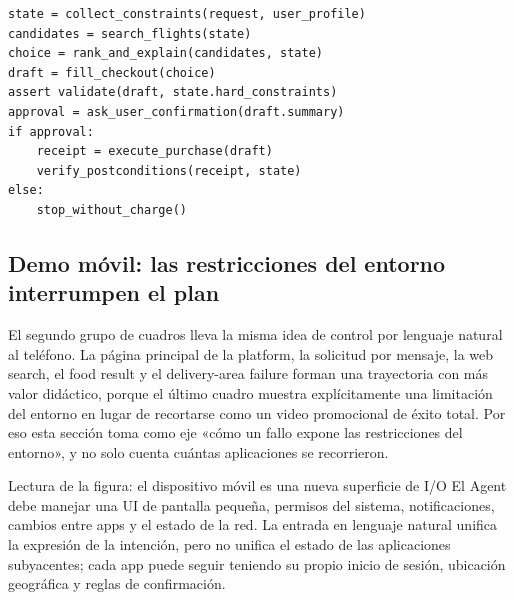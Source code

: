
\begin{lstlisting}[caption={Máquina de estados de compra de boletos con puerta de confirmación}]
state = collect_constraints(request, user_profile)
candidates = search_flights(state)
choice = rank_and_explain(candidates, state)
draft = fill_checkout(choice)
assert validate(draft, state.hard_constraints)
approval = ask_user_confirmation(draft.summary)
if approval:
    receipt = execute_purchase(draft)
    verify_postconditions(receipt, state)
else:
    stop_without_charge()
\end{lstlisting}

\subsection{Demo móvil: las restricciones del entorno interrumpen el plan}

El segundo grupo de cuadros lleva la misma idea de control por lenguaje natural al teléfono. La página principal de la platform, la solicitud por mensaje, la web search, el food result y el delivery-area failure forman una trayectoria con más valor didáctico, porque el último cuadro muestra explícitamente una limitación del entorno en lugar de recortarse como un video promocional de éxito total. Por eso esta sección toma como eje «cómo un fallo expone las restricciones del entorno», y no solo cuenta cuántas aplicaciones se recorrieron.


\begin{knowledgebox}{Lectura de la figura: el dispositivo móvil es una nueva superficie de I/O}
El Agent debe manejar una UI de pantalla pequeña, permisos del sistema, notificaciones, cambios entre apps y el estado de la red. La entrada en lenguaje natural unifica la expresión de la intención, pero no unifica el estado de las aplicaciones subyacentes; cada app puede seguir teniendo su propio inicio de sesión, ubicación geográfica y reglas de confirmación.
\end{knowledgebox}

